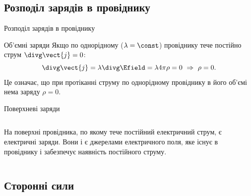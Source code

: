 \documentclass[onlytextwidth]{beamer}
\begin{document}
\subsection{Розподіл зарядів в провіднику}




\begin{frame}{Розподіл зарядів в провіднику}{}
	\begin{block}{Об'ємні заряди}\justifying
		Якщо по однорідному ($\lambda = \const$) провіднику тече постійно струм $\divg\vect{j} = 0$:
		\begin{equation*}
			\divg\vect{j} = \lambda\divg\Efield = \lambda 4\pi \rho = 0\ \Rightarrow\ \rho = 0.
		\end{equation*}
		Це означає, що при протіканні струму по однорідному провіднику в його об'ємі нема заряду $\rho
			= 0$.
	\end{block}

	\begin{block}{Поверхневі заряди}
		\begin{columns}
			\begin{column}{0.7\linewidth}\justifying
				На поверхні провідника, по якому тече постійний електричний струм, є електричні заряди.
				Вони і є джерелами електричного поля, яке існує в провіднику і забезпечує наявність
				постійного струму.
			\end{column}
			\hfill
			\begin{column}{0.25\linewidth}\centering
				
			\end{column}
		\end{columns}
	\end{block}
\end{frame}


\subsection{Сторонні сили}
\end{document}

